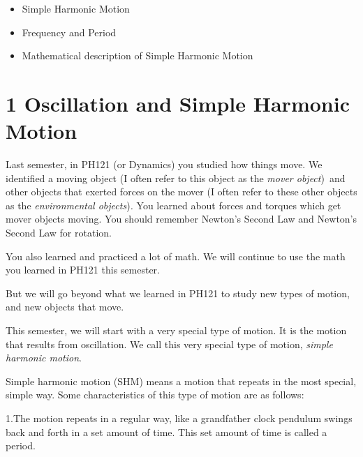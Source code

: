 \documentclass{book}
\begin{document}
\vspace{0.10in}%

\begin{itemize}
\item Simple Harmonic Motion

\item Frequency and Period

\item Mathematical description of Simple Harmonic Motion
\end{itemize}

\section{1 Oscillation and Simple Harmonic Motion}

Last semester, in PH121 (or Dynamics) you studied how things move. We
identified a moving object (I often refer to this object as the \emph{mover
object})\emph{\ }and other objects that exerted forces on the mover (I often
refer to these other objects as the \emph{environmental objects})\emph{.}
You learned about forces and torques which get mover objects moving. You
should remember Newton's Second Law and Newton's Second Law for rotation.

You also learned and practiced a lot of math. We will continue to use the
math you learned in PH121 this semester.

But we will go beyond what we learned in PH121 to study new types of motion,
and new objects that move.

This semester, we will start with a very special type of motion. It is the
motion that results from oscillation. We call this very special type of
motion, \emph{simple harmonic motion}.

Simple harmonic motion (SHM) means a motion that repeats in the most
special, simple way. Some characteristics of this type of motion are as
follows:

1.\qquad The motion repeats in a regular way, like a grandfather clock
pendulum swings back and forth in a set amount of time. This set amount of
time is called a period.
\end{document}

